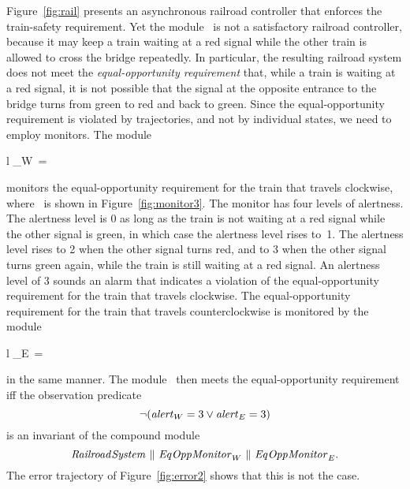   Figure~\ref{fig:rail} presents an asynchronous railroad controller that 
  enforces the train-safety requirement.
  Yet the module \Controller\ is not a satisfactory railroad controller, 
  because it may keep a train waiting at a red signal while the other train 
  is allowed to cross the bridge repeatedly.
  In particular, the resulting railroad system does not meet the 
  {\em equal-opportunity requirement\/} that, while a train is waiting at a 
  red signal, it is not possible that the signal at the opposite entrance to 
  the bridge turns from green to red and back to green.
  Since the equal-opportunity requirement is violated by trajectories, and 
  not by individual states, we need to employ monitors.
  The module 
  \begin{mtab}{l}
    \EqOppMonitor_W\ =\ \\
    \qu \EqOppMonitor[\level,\pc,\signal_1,\signal_2:=
      \level_W,\pc_W,\signal_W,\signal_E]
  \end{mtab}
  monitors the equal-opportunity requirement for the train that travels 
  clockwise, where \EqOppMonitor\ is shown in Figure~\ref{fig:monitor3}.
  The monitor has four levels of alertness.
  The alertness level is 0 as long as the train is not waiting at a red 
  signal while the other signal is green, in which case the alertness level 
  rises to~1.
  The alertness level rises to 2 when the other signal turns red, and to 3
  when the other signal turns green again, while the train is still waiting 
  at a red signal.
  An alertness level of 3 sounds an alarm that indicates a violation of the 
  equal-opportunity requirement for the train that travels clockwise.
  The equal-opportunity requirement for the train that travels 
  counterclockwise is monitored by the module 
  \begin{mtab}{l}
    \EqOppMonitor_E\ =\ \\
    \qu \EqOppMonitor[\level,\pc,\signal_1,\signal_2:=
      \level_E,\pc_E,\signal_E,\signal_W]
  \end{mtab}
  in the same manner.
  The module \Controller\ then meets the equal-opportunity requirement iff 
  the observation predicate
    \[\neg({\it alert\/}_W=3\lor{\it alert\/}_E=3)\]
  is an invariant of the compound module
    \[{\it Railroad\-System\/}\ \|\ {\it Eq\-Opp\-\-Monitor\/}_W\ \|\ {\it Eq\-Opp\-\-Monitor\/}_E.\]
  The error trajectory of Figure~\ref{fig:error2} shows that this is not the 
  case.


